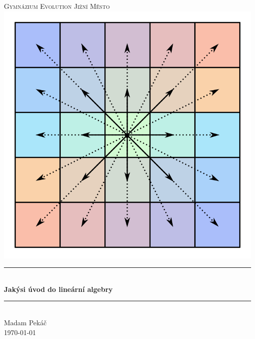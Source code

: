 \begin{titlepage}
 \newcommand{\HRule}{\rule{\linewidth}{0.5mm}}
 \center
 \textsc{\LARGE
  Gymnázium Evolution Jižní Město
 } \\[1cm]
 \includegraphics[width=.5\textwidth]{grid.png} \\[1cm]
 \HRule \\[0.4cm]
 { \huge \sffamily \bfseries Jakýsi úvod do lineární algebry\\[0.4cm] }
 \HRule \\[1.5cm]
 \large Madam Pekáč
 \\[1cm]
 \large \today \\ [1cm]
\end{titlepage}
